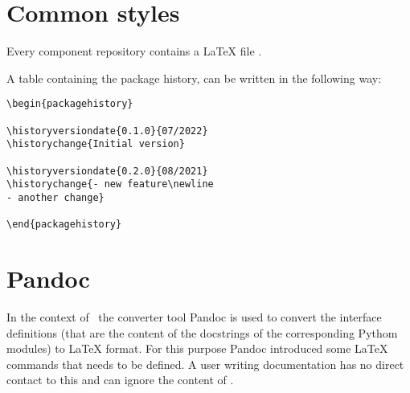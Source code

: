 \documentclass[a4paper,10pt]{report}
\begin{document}

\chapter{Common styles}

Every component repository contains a LaTeX file .

A table containing the package history, can be written in the following way:

\begin{verbatim}
\begin{packagehistory}

\historyversiondate{0.1.0}{07/2022}
\historychange{Initial version}

\historyversiondate{0.2.0}{08/2021}
\historychange{- new feature\newline
- another change}

\end{packagehistory}
\end{verbatim}

\begin{packagehistory}



\end{packagehistory}


\chapter{Pandoc}

In the context of \rfw\ the converter tool Pandoc is used to convert the interface definitions (that are the content of the docstrings of the corresponding
Pythom modules) to LaTeX format. For this purpose Pandoc introduced some LaTeX commands that needs to be defined. A user writing documentation has no direct
contact to this and can ignore the content of .

\end{document}

